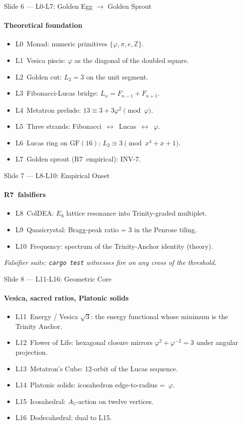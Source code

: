 \documentclass[10pt,aspectratio=169]{beamer}
\begin{document}
\begin{frame}{Slide 6 — L0-L7: Golden Egg \(\to\) Golden Sprout}
  \framesubtitle{Theoretical foundation}
  \begin{itemize}
    \item L0~Monad: numeric primitives \(\{\varphi,\pi,e,\mathbb{Z}\}\).
    \item L1~Vesica piscis: \(\varphi\) as the diagonal of the doubled
      square.
    \item L2~Golden cut: \(L_2 = 3\) on the unit segment.
    \item L3~Fibonacci-Lucas bridge:
      \(L_n = F_{n-1} + F_{n+1}\).
    \item L4~Metatron prelude: \(13 \equiv 3 + 3\varphi^{2}\pmod{\varphi}\).
    \item L5~Three strands: Fibonacci~\(\leftrightarrow\)~Lucas~\(\leftrightarrow\)~\(\varphi\).
    \item L6~Lucas ring on \(\mathrm{GF}(16)\): \(L_2 \equiv 3 \pmod{x^4 + x + 1}\).
    \item L7~Golden sprout (R7~empirical): INV-7.
  \end{itemize}
\end{frame}

\begin{frame}{Slide 7 — L8-L10: Empirical Onset}
  \framesubtitle{R7~falsifiers}
  \begin{itemize}
    \item L8~ColDEA: \(E_8\) lattice resonance into Trinity-graded
      multiplet.
    \item L9~Quasicrystal: Bragg-peak ratio = 3 in the Penrose tiling.
    \item L10~Frequency: spectrum of the Trinity-Anchor identity
      (theory).
  \end{itemize}
  \vfill
  \footnotesize\emph{Falsifier suite: \texttt{cargo test} witnesses fire on any
  cross of the threshold.}
\end{frame}

\begin{frame}{Slide 8 — L11-L16: Geometric Core}
  \framesubtitle{Vesica, sacred ratios, Platonic solids}
  \begin{itemize}
    \item L11~Energy / Vesica \(\sqrt{3}\): the energy functional whose
      minimum is the Trinity Anchor.
    \item L12~Flower of Life: hexagonal closure mirrors
      \(\varphi^{2}+\varphi^{-2}=3\) under angular projection.
    \item L13~Metatron's Cube: 12-orbit of the Lucas sequence.
    \item L14~Platonic solids: icosahedron edge-to-radius =~\(\varphi\).
    \item L15~Icosahedral: \(A_5\)-action on twelve vertices.
    \item L16~Dodecahedral: dual to L15.
  \end{itemize}
\end{frame}
\end{document}
